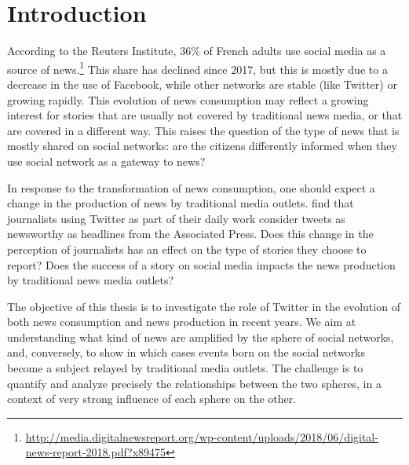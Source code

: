 \chapter{Introduction}
According to the Reuters Institute, 36\% of French adults use social media as a source of news.\footnote{\url{http://media.digitalnewsreport.org/wp-content/uploads/2018/06/digital-news-report-2018.pdf?x89475}}  This share has declined since 2017, but this is mostly due to a decrease in the use of Facebook, while other networks are stable (like Twitter) or growing rapidly. This evolution of news consumption may reflect a growing interest for stories that are usually not covered by traditional news media, or that are covered in a different way. This raises the question of the type of news that is mostly shared on social networks: are the citizens differently informed when they use social network as a gateway to news? 
\newline

In response to the transformation of news consumption, one should expect a change in the production of news by traditional media outlets. \citet{mcgregor_twitter_2018} find that journalists using Twitter as part of their daily work consider tweets as newsworthy as headlines from the Associated Press. Does this change in the perception of journalists has an effect on the type of stories they choose to report? Does the success of a story on social media impacts the news production by traditional news media outlets?
\newline

The objective of this thesis is to investigate the role of Twitter in the evolution of both news consumption and news production in recent years. We aim at understanding what kind of news are  amplified by the sphere of social networks, and, conversely, to show in which cases events born on the social networks become a subject relayed by traditional media outlets. The challenge is to quantify and analyze precisely the relationships between the two spheres, in a context of very strong influence of each sphere on the other. 
\newline


